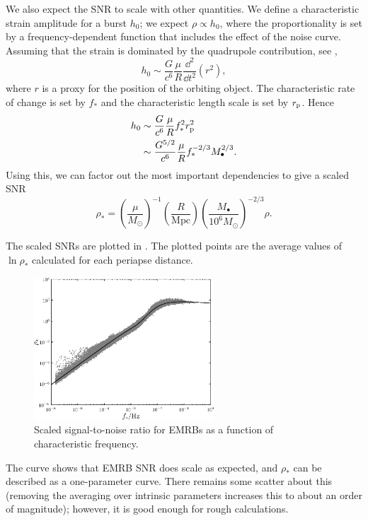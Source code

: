We also expect the SNR to scale with other quantities. We define a characteristic strain amplitude for a burst $h_0$; we expect $\rho \propto h_0$, where the proportionality is set by a frequency-dependent function that includes the effect of the noise curve. Assuming that the strain is dominated by the quadrupole contribution, see , 
\begin{equation}
h_0 \sim \frac{G}{c^6}\frac{\mu}{R}\frac{\dd^2}{\dd t^2}\left(r^2\right),
\end{equation}
where $r$ is a proxy for the position of the orbiting object. The characteristic rate of change is set by $f_\ast$ and the characteristic length scale is set by $r_\mathrm{p}$. Hence
\begin{align}
h_0 \sim {} & \frac{G}{c^6}\frac{\mu}{R}f_\ast^2 r_\mathrm{p}^2 \\
 \sim {} & \frac{G^{5/2}}{c^6}\frac{\mu}{R}f_\ast^{-2/3}M_\bullet^{2/3}.
\end{align}
Using this, we can factor out the most important dependencies to give a scaled SNR
\begin{equation}
\rho_\ast = \left(\frac{\mu}{M_\odot}\right)^{-1}\left(\frac{R}{\mathrm{Mpc}}\right)\left(\frac{M_\bullet}{10^6 M_\odot}\right)^{-2/3}\rho.
\label{eq:SNR-scaling}
\end{equation}

The scaled SNRs are plotted in . The plotted points are the average values of $\ln \rho_\ast$ calculated for each periapse distance.
\begin{figure}[!htp]
\begin{center}
 \includegraphics[width=0.6\textwidth]{./images/Fig_SNR_scaled_fit}
 \caption{Scaled signal-to-noise ratio for EMRBs as a function of characteristic frequency.\label{fig:scaled-SNR}}
   \end{center}
\end{figure}
The curve shows that EMRB SNR does scale as expected, and $\rho_\ast$ can be described as a one-parameter curve. There remains some scatter about this (removing the averaging over intrinsic parameters increases this to about an order of magnitude); however, it is good enough for rough calculations.

